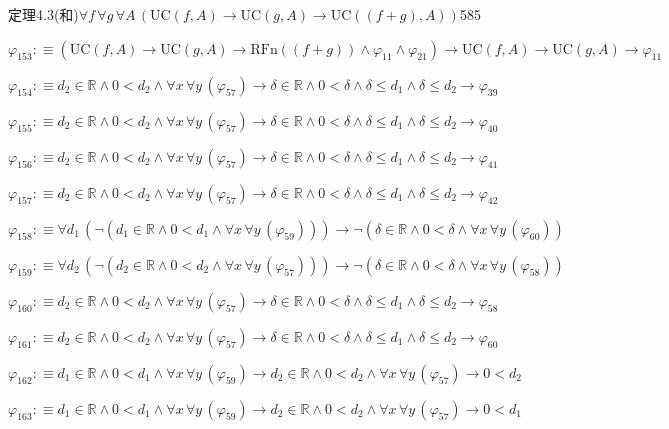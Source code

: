 \begin{fullproof}{定理4.3(和)}{$\forall f\,\forall g\,\forall A\,(\mathrm{UC}(f,A) \to \mathrm{UC}(g,A) \to \mathrm{UC}((f + g),A))$}{585}
\begin{abbrevlist}
\item $\varphi_{153} :\equiv (\mathrm{UC}(f,A) \to \mathrm{UC}(g,A) \to \mathrm{RFn}((f + g)) \land \varphi_{11} \land \varphi_{21}) \to \mathrm{UC}(f,A) \to \mathrm{UC}(g,A) \to \varphi_{11}$
\item $\varphi_{154} :\equiv d_{2} \in \mathbb{R} \land 0 < d_{2} \land \forall x\,\forall y\,(\varphi_{57}) \to \delta \in \mathbb{R} \land 0 < \delta \land \delta \leq d_{1} \land \delta \leq d_{2} \to \varphi_{39}$
\item $\varphi_{155} :\equiv d_{2} \in \mathbb{R} \land 0 < d_{2} \land \forall x\,\forall y\,(\varphi_{57}) \to \delta \in \mathbb{R} \land 0 < \delta \land \delta \leq d_{1} \land \delta \leq d_{2} \to \varphi_{40}$
\item $\varphi_{156} :\equiv d_{2} \in \mathbb{R} \land 0 < d_{2} \land \forall x\,\forall y\,(\varphi_{57}) \to \delta \in \mathbb{R} \land 0 < \delta \land \delta \leq d_{1} \land \delta \leq d_{2} \to \varphi_{41}$
\item $\varphi_{157} :\equiv d_{2} \in \mathbb{R} \land 0 < d_{2} \land \forall x\,\forall y\,(\varphi_{57}) \to \delta \in \mathbb{R} \land 0 < \delta \land \delta \leq d_{1} \land \delta \leq d_{2} \to \varphi_{42}$
\item $\varphi_{158} :\equiv \forall d_{1}\,(\neg (d_{1} \in \mathbb{R} \land 0 < d_{1} \land \forall x\,\forall y\,(\varphi_{59}))) \to \neg (\delta \in \mathbb{R} \land 0 < \delta \land \forall x\,\forall y\,(\varphi_{60}))$
\item $\varphi_{159} :\equiv \forall d_{2}\,(\neg (d_{2} \in \mathbb{R} \land 0 < d_{2} \land \forall x\,\forall y\,(\varphi_{57}))) \to \neg (\delta \in \mathbb{R} \land 0 < \delta \land \forall x\,\forall y\,(\varphi_{58}))$
\item $\varphi_{160} :\equiv d_{2} \in \mathbb{R} \land 0 < d_{2} \land \forall x\,\forall y\,(\varphi_{57}) \to \delta \in \mathbb{R} \land 0 < \delta \land \delta \leq d_{1} \land \delta \leq d_{2} \to \varphi_{58}$
\item $\varphi_{161} :\equiv d_{2} \in \mathbb{R} \land 0 < d_{2} \land \forall x\,\forall y\,(\varphi_{57}) \to \delta \in \mathbb{R} \land 0 < \delta \land \delta \leq d_{1} \land \delta \leq d_{2} \to \varphi_{60}$
\item $\varphi_{162} :\equiv d_{1} \in \mathbb{R} \land 0 < d_{1} \land \forall x\,\forall y\,(\varphi_{59}) \to d_{2} \in \mathbb{R} \land 0 < d_{2} \land \forall x\,\forall y\,(\varphi_{57}) \to 0 < d_{2}$
\item $\varphi_{163} :\equiv d_{1} \in \mathbb{R} \land 0 < d_{1} \land \forall x\,\forall y\,(\varphi_{59}) \to d_{2} \in \mathbb{R} \land 0 < d_{2} \land \forall x\,\forall y\,(\varphi_{57}) \to 0 < d_{1}$

\end{abbrevlist}
\end{fullproof}
